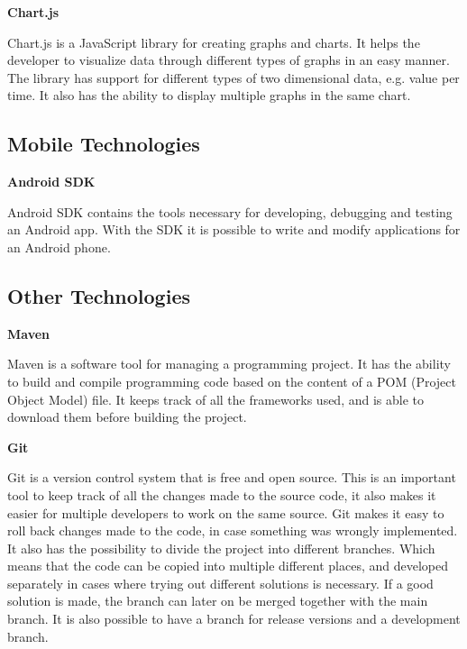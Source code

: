 \textbf{Chart.js}

Chart.js is a JavaScript library for creating graphs and charts.
It helps the developer to visualize data through different types of graphs in an easy manner.
The library has support for different types of two dimensional data, e.g. value per time.
It also has the ability to display multiple graphs in the same chart.  \cite{Chartjs}

\subsection{Mobile Technologies}

\textbf{Android SDK}

Android SDK contains the tools necessary for developing, debugging and testing an Android app.
With the SDK it is possible to write and modify applications for an Android phone. \cite{AndroidSDK}

\subsection{Other Technologies}

\textbf{Maven}

Maven is a software tool for managing a programming project.
It has the ability to build and compile programming code based on the content of a POM (Project Object Model) file.
It keeps track of all the frameworks used, and is able to download them before building the project. \cite{Maven}

\textbf{Git}

Git is a version control system that is free and open source.
This is an important tool to keep track of all the changes made to the source code, it also makes it easier for multiple developers to work on the same source.
Git makes it easy to roll back changes made to the code, in case something was wrongly implemented.
It also has the possibility to divide the project into different branches.
Which means that the code can be copied into multiple different places, and developed separately in cases where trying out different solutions is necessary.
If a good solution is made, the branch can later on be merged together with the main branch.
It is also possible to have a branch for release versions and a development branch. \cite{Git}

